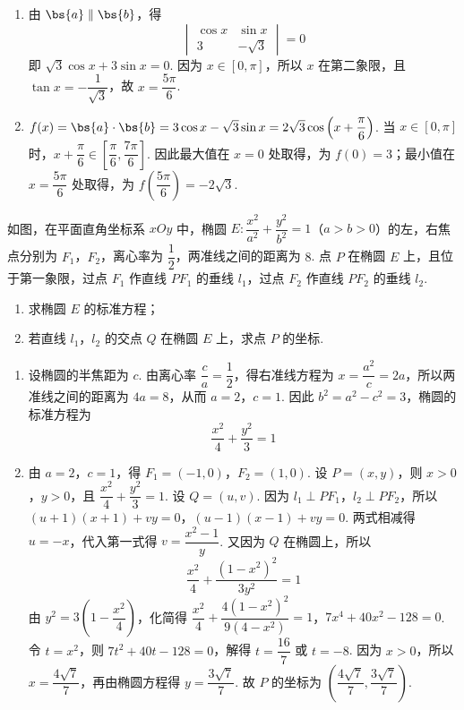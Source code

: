 \begin{solution}
\begin{enumerate}
\item 由 \(\bs{a}\parallel\bs{b}\)，得
\[
\begin{vmatrix}\cos x&\sin x\\3&-\sqrt3\end{vmatrix}=0
\]
即 \(\sqrt3\cos x+3\sin x=0\). 因为 \(x\in[0,\pi]\)，所以 \(x\) 在第二象限，且 \(\tan x=-\dfrac{1}{\sqrt3}\)，故 \(x=\dfrac{5\pi}{6}\).
\item \(f(x)=\bs{a}\cdot\bs{b}=3\cos x-\sqrt3\sin x=2\sqrt3\cos\left(x+\dfrac{\pi}{6}\right)\). 当 \(x\in[0,\pi]\) 时，\(x+\dfrac{\pi}{6}\in\left[\dfrac{\pi}{6},\dfrac{7\pi}{6}\right]\). 因此最大值在 \(x=0\) 处取得，为 \(f(0)=3\)；最小值在 \(x=\dfrac{5\pi}{6}\) 处取得，为 \(f\left(\dfrac{5\pi}{6}\right)=-2\sqrt3\).
\end{enumerate}
\end{solution}


\begin{problem}
如图，在平面直角坐标系 \(xOy\) 中，椭圆 \(E:\dfrac{x^2}{a^2}+\dfrac{y^2}{b^2}=1\)（\(a>b>0\)）的左，右焦点分别为 \(F_1\)，\(F_2\)，离心率为 \(\dfrac12\)，两准线之间的距离为 \(8\). 点 \(P\) 在椭圆 \(E\) 上，且位于第一象限，过点 \(F_1\) 作直线 \(PF_1\) 的垂线 \(l_1\)，过点 \(F_2\) 作直线 \(PF_2\) 的垂线 \(l_2\).

\begin{enumerate}
\item 求椭圆 \(E\) 的标准方程；
\item 若直线 \(l_1\)，\(l_2\) 的交点 \(Q\) 在椭圆 \(E\) 上，求点 \(P\) 的坐标.
\end{enumerate}

\end{problem}

\begin{solution}
\begin{enumerate}
\item 设椭圆的半焦距为 \(c\). 由离心率 \(\dfrac ca=\dfrac12\)，得右准线方程为 \(x=\dfrac{a^2}{c}=2a\)，所以两准线之间的距离为 \(4a=8\)，从而 \(a=2\)，\(c=1\). 因此 \(b^2=a^2-c^2=3\)，椭圆的标准方程为
\[
\dfrac{x^2}{4}+\dfrac{y^2}{3}=1
\]
\item 由 \(a=2\)，\(c=1\)，得 \(F_1=(-1,0)\)，\(F_2=(1,0)\). 设 \(P=(x,y)\)，则 \(x>0\)，\(y>0\)，且 \(\dfrac{x^2}{4}+\dfrac{y^2}{3}=1\). 设 \(Q=(u,v)\). 因为 \(l_1\perp PF_1\)，\(l_2\perp PF_2\)，所以
\((u+1)(x+1)+vy=0\)，\((u-1)(x-1)+vy=0\).
两式相减得 \(u=-x\)，代入第一式得 \(v=\dfrac{x^2-1}{y}\). 又因为 \(Q\) 在椭圆上，所以
\[
\dfrac{x^2}{4}+\dfrac{(1-x^2)^2}{3y^2}=1
\]
由 \(y^2=3\left(1-\dfrac{x^2}{4}\right)\)，化简得
\(\dfrac{x^2}{4}+\dfrac{4(1-x^2)^2}{9(4-x^2)}=1\)，\(7x^4+40x^2-128=0\).
令 \(t=x^2\)，则 \(7t^2+40t-128=0\)，解得 \(t=\dfrac{16}{7}\) 或 \(t=-8\). 因为 \(x>0\)，所以 \(x=\dfrac{4\sqrt7}{7}\)，再由椭圆方程得 \(y=\dfrac{3\sqrt7}{7}\). 故 \(P\) 的坐标为 \(\left(\dfrac{4\sqrt7}{7},\dfrac{3\sqrt7}{7}\right)\).
\end{enumerate}
\end{solution}


